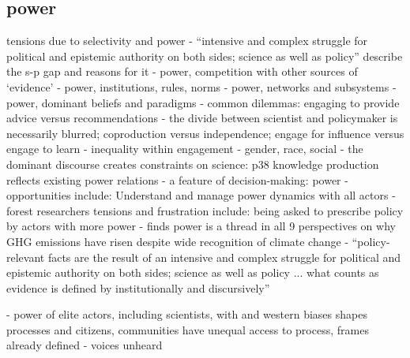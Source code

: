 \subsection{power}
\cite{StrassheimK2014} tensions due to selectivity and power - ``intensive and complex struggle for political and epistemic authority on both sides; science as well as policy''
\cite{OlejniczakBDP2019} describe the s-p gap and reasons for it
\cite{CairneyO2020} - power, competition with other sources of `evidence'
\cite{CairneyO2020} - power, institutions, rules, norms
\cite{CairneyO2020} - power, networks and subsystems
\cite{CairneyO2020} - power, dominant beliefs and paradigms
\cite{CairneyO2020} - common dilemmas: engaging to provide advice versus recommendations - the divide between scientist and policymaker is necessarily blurred; coproduction versus independence; engage for influence versus engage to learn 
\cite{CairneyO2020} - inequality within engagement - gender, race, social
\cite{Carton2021} - the dominant discourse creates constraints on science: p38 knowledge production reflects existing power relations
\cite{MoallemiZHSMZHKHMGLB2023} - a feature of decision-making: power
\cite{MoallemiZHSMZHKHMGLB2023} - opportunities include: Understand and manage power dynamics with all actors
\cite{OjanenBKP2021} - forest researchers tensions and frustration include: being asked to prescribe policy by actors with more power
\cite{StoddardEtAl2021} - finds power is a thread in all 9 perspectives on why GHG emissions have risen despite wide recognition of climate change
\cite{StrassheimK2014} - ``policy-relevant facts are the result of an intensive and complex struggle for political and epistemic authority on both sides; science as well as policy ... what counts as evidence is defined by institutionally and discursively''

\cite{TurnhoutMWKL2020} - power of elite actors, including scientists, with and western biases shapes processes and citizens, communities have unequal access to process, frames already defined - voices unheard 



